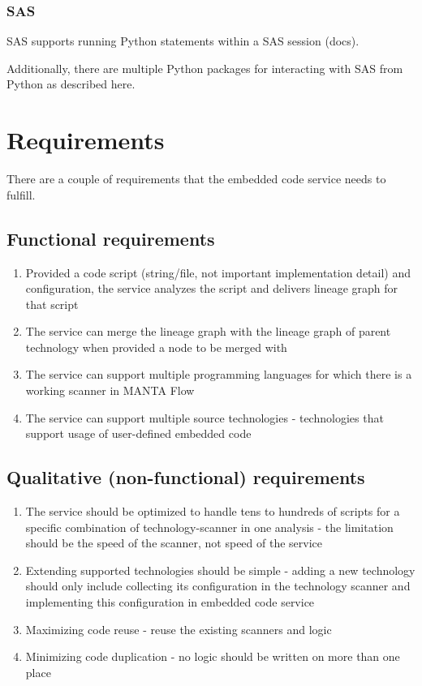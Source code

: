 \subsubsection{SAS}
SAS supports running Python statements within a SAS session (docs).

Additionally, there are multiple Python packages for interacting with SAS from Python as described here.

\section{Requirements}

There are a couple of requirements that the embedded code service needs to fulfill. 

\subsection{Functional requirements}
\begin{enumerate}
    \item Provided a code script (string/file, not important implementation detail) and configuration, the service analyzes the script and delivers lineage graph for that script
    \item The service can merge the lineage graph with the lineage graph of parent technology when provided a node to be merged with
    \item The service can support multiple programming languages for which there is a working scanner in MANTA Flow
    \item The service can support multiple source technologies - technologies that support usage of user-defined embedded code
\end{enumerate}

\subsection{Qualitative (non-functional) requirements}
\begin{enumerate}
    \item The service should be optimized to handle tens to hundreds of scripts for a specific combination of technology-scanner in one analysis - the limitation should be the speed of the scanner, not speed of the service
    \item Extending supported technologies should be simple - adding a new technology should only include collecting its configuration in the technology scanner and implementing this configuration in embedded code service
    \item Maximizing code reuse - reuse the existing scanners and logic
    \item Minimizing code duplication - no logic should be written on more than one place
\end{enumerate}